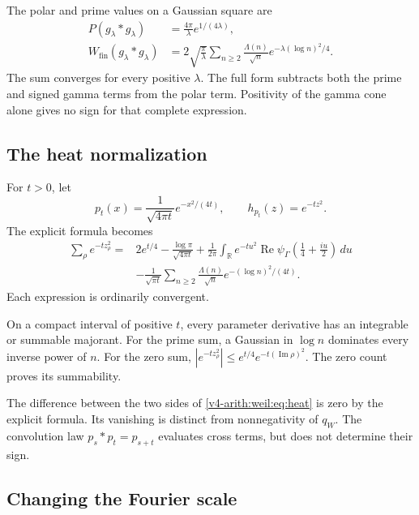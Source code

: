 The polar and prime values on a Gaussian square are
\begin{equation}
 \begin{aligned}
 P(g_\lambda*g_\lambda)&=\frac{4\pi}{\lambda}e^{1/(4\lambda)},\\
 W_{\mathrm{fin}}(g_\lambda*g_\lambda)
   &=2\sqrt{\frac\pi\lambda}
       \sum_{n\ge2}\frac{\Lambda(n)}{\sqrt n}
                          e^{-\lambda(\log n)^2/4}.
 \end{aligned}
 \label{v4-arith:weil:eq:gaussian-arithmetic}
\end{equation}
The sum converges for every positive \(\lambda\).
The full form subtracts both the prime and signed gamma terms
from the polar term. Positivity of the gamma cone alone gives
no sign for that complete expression.

\subsection{The heat normalization}

For \(t>0\), let
\[
 p_t(x)=\frac1{\sqrt{4\pi t}}e^{-x^2/(4t)},\qquad h_{p_t}(z)=e^{-tz^2}.
\]
The explicit formula becomes
\begin{equation}
 \begin{aligned}
 \sum_\rho e^{-tz_\rho^2}
 ={}&2e^{t/4}-\frac{\log\pi}{\sqrt{4\pi t}}
    +\frac1{2\pi}\int_{\mathbb R}
         e^{-tu^2}\operatorname{Re}\psi_\Gamma(\tfrac14+\tfrac{iu}{2})\,du\\
 &-\frac1{\sqrt{\pi t}}
       \sum_{n\ge2}\frac{\Lambda(n)}{\sqrt n}
                           e^{-(\log n)^2/(4t)}.
 \end{aligned}
 \label{v4-arith:weil:eq:heat}
\end{equation}
Each expression is ordinarily convergent.

On a compact interval of
positive \(t\), every parameter derivative has an integrable or summable
majorant. For the prime sum, a Gaussian in \(\log n\) dominates
every inverse power of \(n\). For the zero sum,
\(|e^{-tz_\rho^2}|\le e^{t/4}e^{-t(\operatorname{Im}\rho)^2}\).
The zero count proves its summability.

The difference between the two sides of \eqref{v4-arith:weil:eq:heat}
is zero by the explicit formula. Its vanishing is distinct from
nonnegativity of \(q_W\). The convolution law
\(p_s*p_t=p_{s+t}\) evaluates cross terms, but does not determine
their sign.

\subsection{Changing the Fourier scale}

